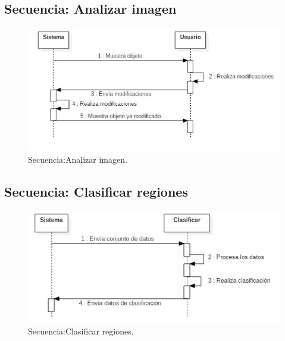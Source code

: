 \documentclass[12pt]{report}
\begin{document}
\subsection{Secuencia: Analizar imagen}
\begin{figure}[H]
\centering
\includegraphics[width = 12 cm, height = 7 cm]{analisis}
\caption{Secuencia:Analizar imagen.}
\end{figure}

\subsection{Secuencia: Clasificar regiones}
\begin{figure}[H]
\centering
\includegraphics[width = 12 cm, height = 7 cm]{clasificacion}
\caption{Secuencia:Clasificar regiones.}
\end{figure}
\end{document}
